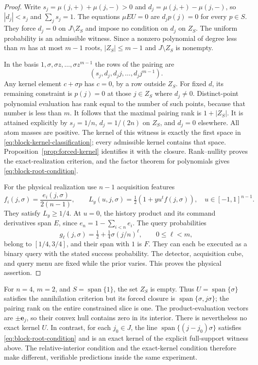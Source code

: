 \documentclass[11pt]{amsart}
\theoremstyle{definition}\newtheorem{definition}[theorem]{Definition}
\theoremstyle{remark}\newtheorem{remark}[theorem]{Remark}
\DeclareMathOperator{\spanop}{span}\DeclareMathOperator{\rank}{rank}
\begin{document}
\begin{proof}
Write $s_j=\mu(j,+)+\mu(j,-)>0$ and
$d_j=\mu(j,+)-\mu(j,-)$, so $|d_j|<s_j$ and $\sum_j s_j=1$.
The equations $\mu E U=0$ are $d_jp(j)=0$ for every $p\in S$.
They force $d_j=0$ on $J\setminus Z_S$ and impose no condition on
$d_j$ on $Z_S$. The uniform probability is an admissible witness.
Since a nonzero polynomial of degree less than $m$ has at most $m-1$
roots, $|Z_S|\le m-1$ and $J\setminus Z_S$ is nonempty.

In the basis $1,\sigma,\sigma z,\ldots,\sigma z^{m-1}$ the rows of
the pairing are
\[
 (s_j,d_j,d_jj,\ldots,d_jj^{m-1}).
\]
Any kernel element $c+\sigma p$ has $c=0$, by a row outside $Z_S$.
For fixed $d$, its remaining constraint is $p(j)=0$ at those $j\in Z_S$
where $d_j\ne0$. Distinct-point polynomial evaluation has rank equal
to the number of such points, because that number is less than $m$.
It follows that the maximal pairing rank is $1+|Z_S|$. It is attained
explicitly by $s_j=1/n$, $d_j=1/(2n)$ on $Z_S$, and $d_j=0$
elsewhere. All atom masses are positive. The kernel of this witness is
exactly the first space in \eqref{eq:block-kernel-classification}; every
admissible kernel contains that space. Proposition~\ref{prop:forced-kernel}
identifies it with the closure. Rank--nullity proves the exact-realization
criterion, and the factor theorem for polynomials gives
\eqref{eq:block-root-condition}.

For the physical realization use $n-1$ acquisition features
\[
 f_i(j,\sigma)=\frac{e_i(j,\sigma)}{2(n-1)},\qquad
 L_y(u,j,\sigma)=\tfrac12(1+y u^tf(j,\sigma)),
 \quad u\in[-1,1]^{n-1}.
\]
They satisfy $L_y\ge1/4$. At $u=0$, the history product and its command
derivatives span $E$, since $e_n=1-\sum_{i<n}e_i$. The query
probabilities
\[
 g_\ell(j,\sigma)=\tfrac12+\tfrac14\sigma(j/n)^\ell,
 \qquad 0\le\ell<m,
\]
belong to $[1/4,3/4]$, and their span with $1$ is $F$. They can each
be executed as a binary query with the stated success probability.
The detector, acquisition cube, and query menu are fixed while the
prior varies. This proves the physical assertion.
\end{proof}

For $n=4$, $m=2$, and $S=\spanop\{1\}$, the set $Z_S$ is empty.
Thus $U=\spanop\{\sigma\}$ satisfies the annihilation criterion but
its forced closure is $\spanop\{\sigma,j\sigma\}$; the pairing rank
on the entire constrained slice is one. The product-evaluation vectors
are $\pm\mathbf e_j$, so their convex hull contains zero in its
interior. There is nevertheless no exact kernel $U$. In contrast, for
each $j_0\in J$, the line $\spanop\{(j-j_0)\sigma\}$ satisfies
\eqref{eq:block-root-condition} and is an exact kernel of the explicit
full-support witness above. The relative-interior condition and the
exact-kernel condition therefore make different, verifiable predictions
inside the same experiment.
\end{document}
